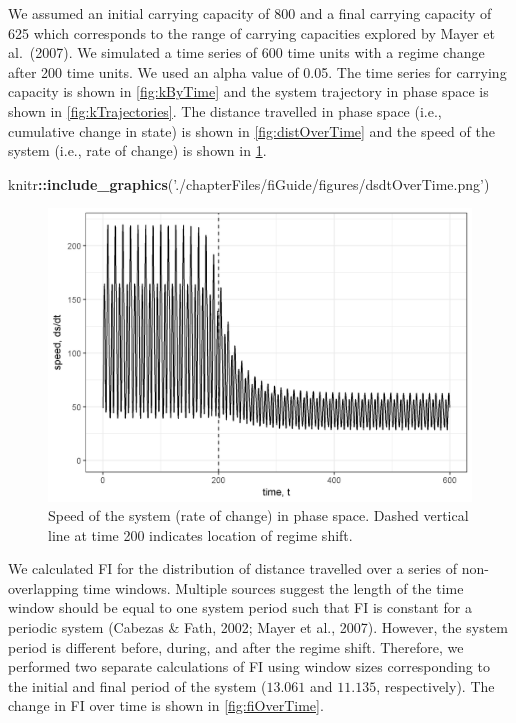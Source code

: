 \documentclass[12pt,twoside,openany]{reedthesis}
\newenvironment{Shaded}{\begin{snugshade}}{\end{snugshade}}
\newcommand{\KeywordTok}[1]{\textcolor[rgb]{0.13,0.29,0.53}{\textbf{#1}}}
\newcommand{\NormalTok}[1]{#1}
\newcommand{\OperatorTok}[1]{\textcolor[rgb]{0.81,0.36,0.00}{\textbf{#1}}}
\newcommand{\StringTok}[1]{\textcolor[rgb]{0.31,0.60,0.02}{#1}}
\begin{document}
We assumed an initial carrying capacity of 800 and a final carrying capacity of 625 which corresponds to the range of carrying capacities explored by Mayer et al.~(2007). We simulated a time series of 600 time units with a regime change after 200 time units. We used an alpha value of 0.05. The time series for carrying capacity is shown in \ref{fig:kByTime} and the system trajectory in phase space is shown in \ref{fig:kTrajectories}. The distance travelled in phase space (i.e., cumulative change in state) is shown in \ref{fig:distOverTime} and the speed of the system (i.e., rate of change) is shown in \ref{fig:dsdtOverTime}.
\begin{Shaded}
\begin{Highlighting}[]
\NormalTok{knitr}\OperatorTok{::}\KeywordTok{include_graphics}\NormalTok{(}\StringTok{'./chapterFiles/fiGuide/figures/dsdtOverTime.png'}\NormalTok{)}
\end{Highlighting}
\end{Shaded}
\begin{figure}
\includegraphics[width=27.08in]{./chapterFiles/fiGuide/figures/dsdtOverTime} \caption{Speed of the system (rate of change) in phase space. Dashed vertical line at time 200 indicates location of regime shift.}\label{fig:dsdtOverTime}
\end{figure}
We calculated FI for the distribution of distance travelled over a series of non-overlapping time windows. Multiple sources suggest the length of the time window should be equal to one system period such that FI is constant for a periodic system (Cabezas \& Fath, 2002; Mayer et al., 2007). However, the system period is different before, during, and after the regime shift. Therefore, we performed two separate calculations of FI using window sizes corresponding to the initial and final period of the system (\(13.061\) and \(11.135\), respectively). The change in FI over time is shown in \ref{fig:fiOverTime}.
\end{document}
